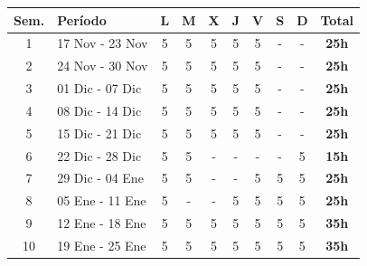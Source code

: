 \begin{table}[H]
\centering
\small
\renewcommand{\arraystretch}{1.5}
\begin{tabular}{|c|l|c|c|c|c|c|c|c|c|}
\hline
\rowcolor[gray]{0.8} 
\textbf{Sem.} & \textbf{Período} & \textbf{L} & \textbf{M} & \textbf{X} & \textbf{J} & \textbf{V} & \textbf{S} & \textbf{D} & \textbf{Total} \\ \hline

1 & 17 Nov - 23 Nov & \cellcolor{cyan!15}5 & \cellcolor{cyan!15}5 & \cellcolor{cyan!15}5 & \cellcolor{cyan!15}5 & \cellcolor{cyan!15}5 & \cellcolor{cyan!15}- & \cellcolor{cyan!15}- & \textbf{25h} \\ \hline
2 & 24 Nov - 30 Nov & \cellcolor{cyan!15}5 & \cellcolor{cyan!15}5 & \cellcolor{cyan!15}5 & \cellcolor{cyan!15}5 & \cellcolor{cyan!15}5 & \cellcolor{cyan!15}- & \cellcolor{cyan!15}- & \textbf{25h} \\ \hline

3 & 01 Dic - 07 Dic & \cellcolor{orange!15}5 & \cellcolor{orange!15}5 & \cellcolor{orange!15}5 & \cellcolor{orange!15}5 & \cellcolor{orange!15}5 & \cellcolor{orange!15}- & \cellcolor{orange!15}- & \textbf{25h} \\ \hline
4 & 08 Dic - 14 Dic & \cellcolor{orange!15}5 & \cellcolor{orange!15}5 & \cellcolor{orange!15}5 & \cellcolor{orange!15}5 & \cellcolor{orange!15}5 & \cellcolor{orange!15}- & \cellcolor{orange!15}- & \textbf{25h} \\ \hline
5 & 15 Dic - 21 Dic & \cellcolor{orange!15}5 & \cellcolor{orange!15}5 & \cellcolor{orange!15}5 & \cellcolor{orange!15}5 & \cellcolor{orange!15}5 & \cellcolor{orange!15}- & \cellcolor{orange!15}- & \textbf{25h} \\ \hline
6 & 22 Dic - 28 Dic & \cellcolor{orange!15}5 & \cellcolor{orange!15}5 & \cellcolor{orange!15}- & \cellcolor{orange!15}- & \cellcolor{orange!15}- & \cellcolor{orange!15}- & \cellcolor{orange!15}5 & \textbf{15h} \\ \hline

7 & 29 Dic - 04 Ene & \cellcolor{orange!15}5 & \cellcolor{orange!15}5 & \cellcolor{orange!15}- & \cellcolor{green!15}- & \cellcolor{green!15}5 & \cellcolor{green!15}5 & \cellcolor{green!15}5 & \textbf{25h} \\ \hline

8 & 05 Ene - 11 Ene & \cellcolor{green!15}5 & \cellcolor{green!15}- & \cellcolor{green!15}- & \cellcolor{green!15}5 & \cellcolor{green!15}5 & \cellcolor{green!15}5 & \cellcolor{green!15}5 & \textbf{25h} \\ \hline
9 & 12 Ene - 18 Ene & \cellcolor{green!15}5 & \cellcolor{green!15}5 & \cellcolor{green!15}5 & \cellcolor{green!15}5 & \cellcolor{green!15}5 & \cellcolor{green!15}5 & \cellcolor{green!15}5 & \textbf{35h} \\ \hline
10 & 19 Ene - 25 Ene & \cellcolor{green!15}5 & \cellcolor{green!15}5 & \cellcolor{green!15}5 & \cellcolor{green!15}5 & \cellcolor{green!15}5 & \cellcolor{green!15}5 & \cellcolor{green!15}5 & \textbf{35h} \\ \hline


\end{tabular}
\end{table}
